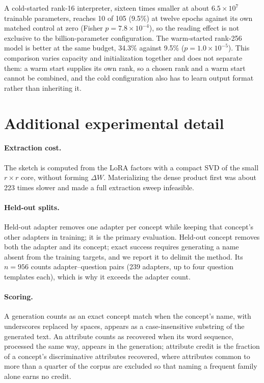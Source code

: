 \documentclass{article}
\begin{document}
A cold-started rank-16 interpreter, sixteen times smaller at about $6.5\times10^{7}$ trainable
parameters, reaches 10 of 105 (9.5\%) at twelve epochs against its own matched control at zero
(Fisher $p = 7.8\times10^{-4}$), so the reading effect is not exclusive to the billion-parameter
configuration. The warm-started rank-256 model is better at the same budget, 34.3\% against 9.5\%
($p = 1.0\times10^{-5}$). This comparison varies capacity and initialization together and does not
separate them: a warm start supplies its own rank, so a chosen rank and a warm start cannot be
combined, and the cold configuration also has to learn output format rather than inheriting it.

\section{Additional experimental detail}
\label{app:detail}

\paragraph{Extraction cost.} The sketch is computed from the LoRA factors with a compact SVD of the
small $r \times r$ core, without forming $\Delta W$. Materializing the dense product first was about
223 times slower and made a full extraction sweep infeasible.

\paragraph{Held-out splits.} Held-out adapter removes one adapter per concept while keeping that
concept's other adapters in training; it is the primary evaluation. Held-out concept removes both
the adapter and its concept; exact success requires generating a name absent from the training
targets, and we report it to delimit the method. Its $n=956$ counts adapter--question pairs (239
adapters, up to four question templates each), which is why it exceeds the adapter count.

\paragraph{Scoring.} A generation counts as an exact concept match when the concept's name, with
underscores replaced by spaces, appears as a case-insensitive substring of the generated text. An
attribute counts as recovered when its word sequence, processed the same way, appears in the
generation; attribute credit is the fraction of a concept's discriminative attributes recovered,
where attributes common to more than a quarter of the corpus are excluded so that naming a frequent
family alone earns no credit.
\end{document}
